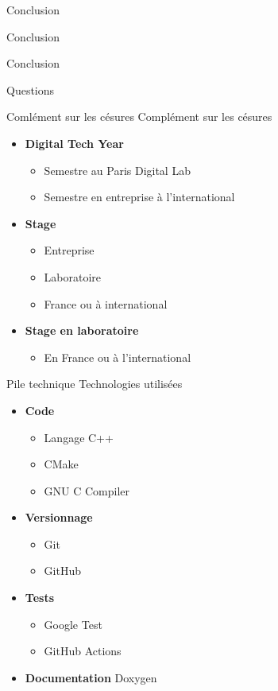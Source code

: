 \documentclass[french, 12pt]{beamer}
\begin{document}
\begin{frame}{Conclusion}
\begin{center}
    \huge{Conclusion}
\end{center}
\end{frame}

\begin{frame}{Conclusion}
    \begin{center}
        \huge{Questions}
    \end{center}
\end{frame}

\begin{frame}{Comlément sur les césures}
Complément sur les césures
\begin{itemize}
    \item \textbf{Digital Tech Year}
    \begin{itemize}
        \item Semestre au Paris Digital Lab
        \item Semestre en entreprise à l'international
    \end{itemize}
    \item \textbf{Stage}
    \begin{itemize}
        \item Entreprise
        \item Laboratoire
        \item France ou à international
    \end{itemize}
    \item \textbf{Stage en laboratoire}
    \begin{itemize}
        \item En France ou à l'international
    \end{itemize}
\end{itemize}
\end{frame}

\begin{frame}{Pile technique}
Technologies utilisées
\begin{itemize}
    \item \textbf{Code}
    \begin{itemize}
        \item Langage C++
        \item CMake
        \item GNU C Compiler
    \end{itemize}
    \item \textbf{Versionnage}
    \begin{itemize}
        \item Git
        \item GitHub
    \end{itemize}
    \item \textbf{Tests}
    \begin{itemize}
        \item Google Test
        \item GitHub Actions
    \end{itemize}
    \item \textbf{Documentation} Doxygen
\end{itemize}
\end{frame}
\end{document}
